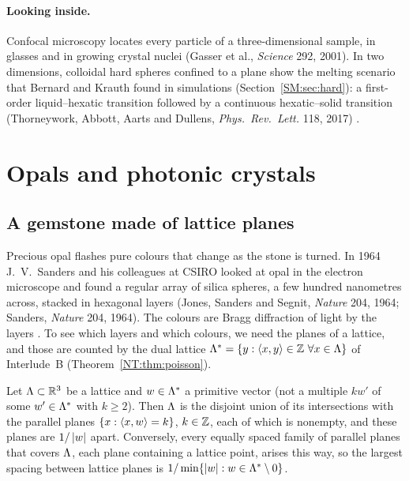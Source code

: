\paragraph{Looking inside.} Confocal microscopy locates every particle of a three-dimensional sample, in
glasses and in growing crystal nuclei (Gasser et al., \emph{Science} 292, 2001). In two dimensions, colloidal hard spheres confined to a plane
show the melting scenario that Bernard and Krauth found in simulations (Section~\ref{SM:sec:hard}): a
first-order liquid--hexatic transition followed by a continuous hexatic--solid transition (Thorneywork,
Abbott, Aarts and Dullens, \emph{Phys.\ Rev.\ Lett.} 118, 2017) .

\section{Opals and photonic crystals}
\label{PHYS:sec:opal}

\subsection*{A gemstone made of lattice planes}
Precious opal flashes pure colours that change as the stone is turned. In 1964 J.~V.~Sanders and his
colleagues at CSIRO looked at opal in the electron microscope and found a regular array of silica
spheres, a few hundred nanometres across, stacked in hexagonal layers (Jones, Sanders and Segnit,
\emph{Nature} 204, 1964; Sanders, \emph{Nature} 204, 1964). The colours are Bragg diffraction of light by the
layers . To see which layers and which colours, we need the planes of a lattice, and
those are counted by the dual lattice $\Lambda^*=\{y:\langle x, y\rangle\in\mathbb{Z}\ \forall x\in\Lambda\}$ of
Interlude~B (Theorem~\ref{NT:thm:poisson}).

\begin{proposition}\label{PHYS:prop:planes}
Let $\Lambda\subset\mathbb{R}^3$ be a lattice and $w\in\Lambda^*$ a primitive vector (not a multiple $kw'$ of
some $w'\in\Lambda^*$ with $k\ge2$). Then $\Lambda$ is the disjoint union of its intersections with the parallel planes
$\{x:\langle x, w\rangle=k\}$, $k\in\mathbb{Z}$, each of which is nonempty, and these planes are $1/\left\lvert w \right\rvert$ apart. Conversely, every equally spaced family of parallel planes that covers $\Lambda$, each plane containing a
lattice point, arises this way, so the largest spacing between lattice planes is
$1/\min\{\left\lvert w \right\rvert:w\in\Lambda^*\setminus0\}$.
\end{proposition}

